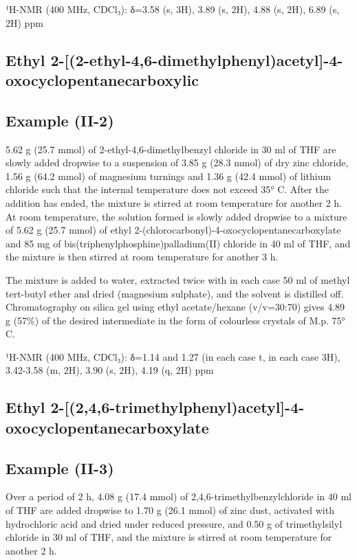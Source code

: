\documentclass[11pt,a4paper]{article}
\begin{document}
¹H-NMR (400 MHz, CDCl₃): δ=3.58 (s, 3H), 3.89 (s, 2H), 4.88 (s, 2H), 6.89 (s, 2H) ppm

\subsection{Ethyl 2-[(2-ethyl-4,6-dimethylphenyl)acetyl]-4-oxocyclopentanecarboxylic}

\subsection{Example (II-2)}

5.62 g (25.7 mmol) of 2-ethyl-4,6-dimethylbenzyl chloride in 30 ml of THF are slowly added dropwise to a suspension of 3.85 g (28.3 mmol) of dry zinc chloride, 1.56 g (64.2 mmol) of magnesium turnings and 1.36 g (42.4 mmol) of lithium chloride such that the internal temperature does not exceed 35° C. After the addition has ended, the mixture is stirred at room temperature for another 2 h. At room temperature, the solution formed is slowly added dropwise to a mixture of 5.62 g (25.7 mmol) of ethyl 2-(chlorocarbonyl)-4-oxocyclopentanecarboxylate and 85 mg of bis(triphenylphosphine)palladium(II) chloride in 40 ml of THF, and the mixture is then stirred at room temperature for another 3 h.

The mixture is added to water, extracted twice with in each case 50 ml of methyl tert-butyl ether and dried (magnesium sulphate), and the solvent is distilled off. Chromatography on silica gel using ethyl acetate/hexane (v/v=30:70) gives 4.89 g (57\%) of the desired intermediate in the form of colourless crystals of M.p. 75° C.

¹H-NMR (400 MHz, CDCl₃): δ=1.14 and 1.27 (in each case t, in each case 3H), 3.42-3.58 (m, 2H), 3.90 (s, 2H), 4.19 (q, 2H) ppm

\subsection{Ethyl 2-[(2,4,6-trimethylphenyl)acetyl]-4-oxocyclopentanecarboxylate}

\subsection{Example (II-3)}

Over a period of 2 h, 4.08 g (17.4 mmol) of 2,4,6-trimethylbenzylchloride in 40 ml of THF are added dropwise to 1.70 g (26.1 mmol) of zinc dust, activated with hydrochloric acid and dried under reduced pressure, and 0.50 g of trimethylsilyl chloride in 30 ml of THF, and the mixture is stirred at room temperature for another 2 h.
\end{document}
